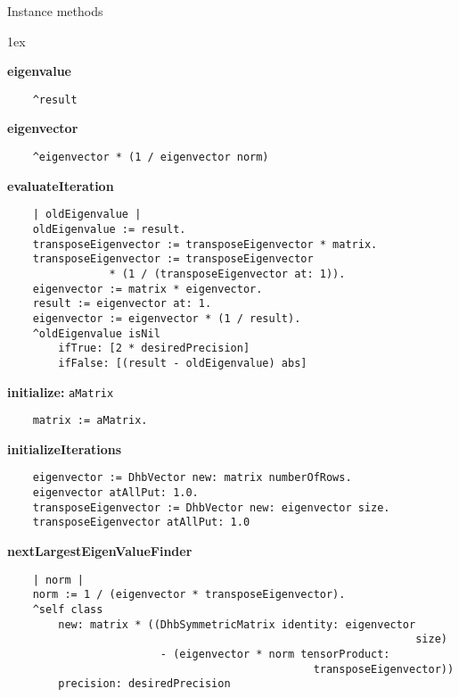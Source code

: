 Instance methods
{\parskip 1ex\par\noindent}
{\bf eigenvalue}
\begin{verbatim}
    ^result

\end{verbatim}
{\bf eigenvector}
\begin{verbatim}
    ^eigenvector * (1 / eigenvector norm)

\end{verbatim}
{\bf evaluateIteration}
\begin{verbatim}
    | oldEigenvalue |
    oldEigenvalue := result.
    transposeEigenvector := transposeEigenvector * matrix.
    transposeEigenvector := transposeEigenvector 
                * (1 / (transposeEigenvector at: 1)).
    eigenvector := matrix * eigenvector.
    result := eigenvector at: 1.
    eigenvector := eigenvector * (1 / result).
    ^oldEigenvalue isNil 
        ifTrue: [2 * desiredPrecision]
        ifFalse: [(result - oldEigenvalue) abs]

\end{verbatim}
{\bf initialize:} {\tt aMatrix}
\begin{verbatim}
    matrix := aMatrix.

\end{verbatim}
{\bf initializeIterations}
\begin{verbatim}
    eigenvector := DhbVector new: matrix numberOfRows.
    eigenvector atAllPut: 1.0.
    transposeEigenvector := DhbVector new: eigenvector size.
    transposeEigenvector atAllPut: 1.0

\end{verbatim}
{\bf nextLargestEigenValueFinder}
\begin{verbatim}
    | norm |
    norm := 1 / (eigenvector * transposeEigenvector).
    ^self class 
        new: matrix * ((DhbSymmetricMatrix identity: eigenvector 
                                                                size) 
                        - (eigenvector * norm tensorProduct: 
                                                transposeEigenvector))
        precision: desiredPrecision

\end{verbatim}

